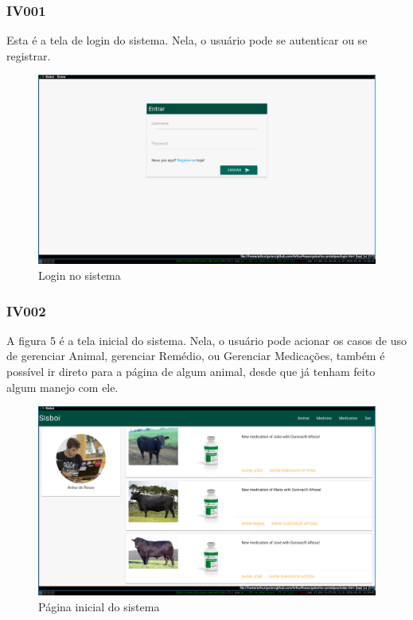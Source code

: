 \documentclass[12pt]{article}
\begin{document}
\begin{titlepage}
\begin{center}
\subsubsection{IV001}

Esta é a tela de login do sistema. Nela, o usuário pode se autenticar ou se registrar.
\begin{figure}[!h]
	\begin{center}
		\caption{Login no sistema}
		\includegraphics[width=13cm]{img/prototipos/login.png}


	\end{center}
\end{figure}

\subsubsection{IV002}

A figura 5 é a tela inicial do sistema. Nela, o usuário pode acionar os casos de uso de gerenciar Animal, gerenciar Remédio, ou Gerenciar Medicações, também é possível ir direto para a página de algum animal, desde que já tenham feito algum manejo com ele.
\begin{figure}[!h]
	\begin{center}
		\caption{Página inicial do sistema}
		\includegraphics[width=13cm]{img/prototipos/index.png}


\end{center}
\end{figure}
\end{center}
\end{titlepage}
\end{document}
